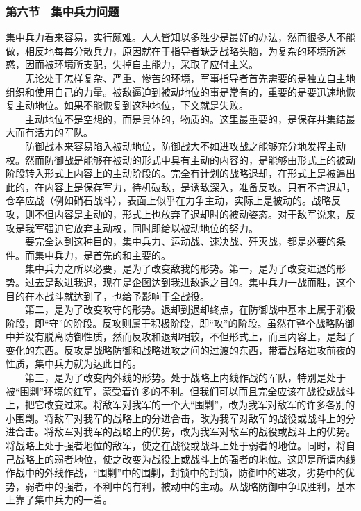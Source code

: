 \documentclass[cn,11pt,chinese]{elegantbook}
\def\myformat#1{\hfil\hfil #1}
\begin{document}
\subsubsection*{\myformat{第六节　集中兵力问题}}
集中兵力看来容易，实行颇难。人人皆知以多胜少是最好的办法，然而很多人不能做，相反地每每分散兵力，原因就在于指导者缺乏战略头脑，为复杂的环境所迷惑，因而被环境所支配，失掉自主能力，采取了应付主义。\\
　　无论处于怎样复杂、严重、惨苦的环境，军事指导者首先需要的是独立自主地组织和使用自己的力量。被敌逼迫到被动地位的事是常有的，重要的是要迅速地恢复主动地位。如果不能恢复到这种地位，下文就是失败。\\
　　主动地位不是空想的，而是具体的，物质的。这里最重要的，是保存并集结最大而有活力的军队。\\
　　防御战本来容易陷入被动地位，防御战大不如进攻战之能够充分地发挥主动权。然而防御战是能够在被动的形式中具有主动的内容的，是能够由形式上的被动阶段转入形式上内容上的主动阶段的。完全有计划的战略退却，在形式上是被逼出此的，在内容上是保存军力，待机破敌，是诱敌深入，准备反攻。只有不肯退却，仓卒应战（例如硝石战斗），表面上似乎在力争主动，实际上是被动的。战略反攻，则不但内容是主动的，形式上也放弃了退却时的被动姿态。对于敌军说来，反攻是我军强迫它放弃主动权，同时即给以被动地位的努力。\\
　　要完全达到这种目的，集中兵力、运动战、速决战、歼灭战，都是必要的条件。而集中兵力，是首先的和主要的。\\
　　集中兵力之所以必要，是为了改变敌我的形势。第一，是为了改变进退的形势。过去是敌进我退，现在是企图达到我进敌退之目的。集中兵力一战而胜，这个目的在本战斗就达到了，也给予影响于全战役。\\
　　第二，是为了改变攻守的形势。退却到退却终点，在防御战中基本上属于消极阶段，即“守”的阶段。反攻则属于积极阶段，即“攻”的阶段。虽然在整个战略防御中并没有脱离防御性质，然而反攻和退却相较，不但形式上，而且内容上，是起了变化的东西。反攻是战略防御和战略进攻之间的过渡的东西，带着战略进攻前夜的性质，集中兵力就为达此目的。\\
　　第三，是为了改变内外线的形势。处于战略上内线作战的军队，特别是处于被“围剿”环境的红军，蒙受着许多的不利。但我们可以而且完全应该在战役或战斗上，把它改变过来。将敌军对我军的一个大“围剿”，改为我军对敌军的许多各别的小围剿。将敌军对我军的战略上的分进合击，改为我军对敌军的战役或战斗上的分进合击。将敌军对我军的战略上的优势，改为我军对敌军的战役或战斗上的优势。将战略上处于强者地位的敌军，使之在战役或战斗上处于弱者的地位。同时，将自己战略上的弱者地位，使之改变为战役上或战斗上的强者的地位。这即是所谓内线作战中的外线作战，“围剿”中的围剿，封锁中的封锁，防御中的进攻，劣势中的优势，弱者中的强者，不利中的有利，被动中的主动。从战略防御中争取胜利，基本上靠了集中兵力的一着。\\
\end{document}
